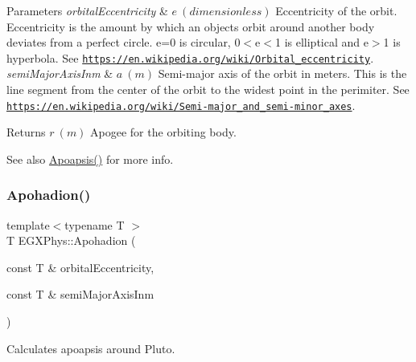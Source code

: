 \begin{DoxyParams}{Parameters}
{\em orbital\+Eccentricity} & $ e\ (dimensionless)$ Eccentricity of the orbit. Eccentricity is the amount by which an objects orbit around another body deviates from a perfect circle. e=0 is circular, 0$<$e$<$1 is elliptical and e$>$1 is hyperbola. See \href{https://en.wikipedia.org/wiki/Orbital_eccentricity}{\tt https\+://en.\+wikipedia.\+org/wiki/\+Orbital\+\_\+eccentricity}. \\
\hline
{\em semi\+Major\+Axis\+Inm} & $ a\ (m)$ Semi-\/major axis of the orbit in meters. This is the line segment from the center of the orbit to the widest point in the perimiter. See \href{https://en.wikipedia.org/wiki/Semi-major_and_semi-minor_axes}{\tt https\+://en.\+wikipedia.\+org/wiki/\+Semi-\/major\+\_\+and\+\_\+semi-\/minor\+\_\+axes}. \\
\hline
\end{DoxyParams}
\begin{DoxyReturn}{Returns}
$ r\ (m)$ Apogee for the orbiting body. 
\end{DoxyReturn}
\begin{DoxySeeAlso}{See also}
\mbox{\hyperlink{group___e_g_x_phys-_apoapsis_gafd08a2d1d64886e7bb9bcb7ff65bc3ea}{Apoapsis()}} for more info. 
\end{DoxySeeAlso}
\mbox{\label{group___e_g_x_phys-_apoapsis_ga9e2578ab880b46f0736936608710f4ad}} 
\subsubsection{\texorpdfstring{Apohadion()}{Apohadion()}}
{\footnotesize\ttfamily template$<$typename T $>$ \\
T E\+G\+X\+Phys\+::\+Apohadion (\begin{DoxyParamCaption}\item[{const T \&}]{orbital\+Eccentricity,  }\item[{const T \&}]{semi\+Major\+Axis\+Inm }\end{DoxyParamCaption})}



Calculates apoapsis around Pluto. 


